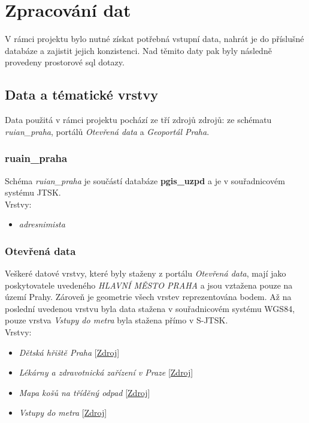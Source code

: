 \documentclass[a4paper, 12pt]{article}
\begin{document}
\section{Zpracování dat}
V rámci projektu bylo nutné získat potřebná vstupní data, nahrát je do příslušné databáze a zajistit jejich konzistenci. Nad těmito daty pak byly následně provedeny prostorové sql dotazy.

\subsection{Data a tématické vrstvy}
Data použitá v rámci projektu pochází ze tří zdrojů zdrojů: ze schématu \textit{ruian\_praha}, portálů \textit{Otevřená data} a \textit{Geoportál Praha}.

\subsubsection{ruain\_praha}
Schéma \textsl{ruian\_praha} je součástí databáze \textbf{pgis\_uzpd} a je v souřadnicovém systému JTSK.\\

Vrstvy:
\begin{itemize}
\item \textsl{adresnimista}
\end{itemize}

\subsubsection{Otevřená data}
Veškeré datové vrstvy, které byly staženy z portálu \textit{Otevřená data}, mají jako poskytovatele uvedeného \textsl{HLAVNÍ MĚSTO PRAHA} a jsou vztažena pouze na území Prahy. Zároveň je geometrie všech vrstev reprezentována bodem. Až na poslední uvedenou vrstvu byla data stažena v souřadnicovém systému WGS84, pouze vrstva \textsl{Vstupy do metra} byla stažena přímo v S-JTSK.\\

Vrstvy:  
\begin{itemize}
\item \textsl{Dětská hřiště Praha} [\href{https://data.gov.cz/datov%C3%A1-sada?iri=https%3A%2F%2Fdata.gov.cz%2Fzdroj%2Fdatov%C3%A1-sada%2Fhttp---opendata.praha.eu-api-3-action-package_show-id-detska-hriste-praha}{Zdroj}]
\item \textsl{Lékárny a zdravotnická zařízení v Praze} [\href{https://data.gov.cz/datov%C3%A1-sada?iri=https%3A%2F%2Fdata.gov.cz%2Fzdroj%2Fdatov%C3%A1-sada%2Fhttp---opendata.praha.eu-api-3-action-package_show-id-lekarny-a-zdravotnicka-zarizeni-v-praze}{Zdroj}]
\item \textsl{Mapa košů na tříděný odpad} [\href{https://data.gov.cz/datov%C3%A1-sada?iri=https%3A%2F%2Fdata.gov.cz%2Fzdroj%2Fdatov%C3%A1-sada%2Fhttp---opendata.praha.eu-api-3-action-package_show-id-mapa-trideny-odpad}{Zdroj}]
\item \textsl{Vstupy do metra} [\href{https://data.gov.cz/datov%C3%A1-sada?iri=https%3A%2F%2Fdata.gov.cz%2Fzdroj%2Fdatov%C3%A1-sada%2Fhttp---opendata.praha.eu-api-3-action-package_show-id-ipr-prazska_integrovana_doprava_-_vstupy_do_metra}{Zdroj}]
\end{itemize}
\end{document}
